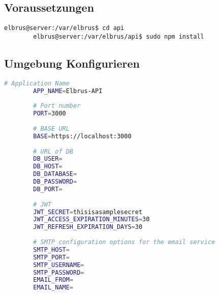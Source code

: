 	\subsection{Voraussetzungen}
	
	\lstset{style=commands}
	\begin{lstlisting}[caption={Nachinstallieren der Abhängigkeiten.}]
		elbrus@server:/var/elbrus$ cd api
		elbrus@server:/var/elbrus/api$ sudo npm install
	\end{lstlisting}

	\subsection[file config]{Umgebung Konfigurieren}
	
	\lstset{style=files}
	\begin{lstlisting}[caption={Anhand von '.env.example' eigene '.env' Datei anlegen.}, language=bash]
		# Application Name
		APP_NAME=Elbrus-API
		
		# Port number
		PORT=3000
		
		# BASE URL
		BASE=https://localhost:3000
		
		# URL of DB
		DB_USER=
		DB_HOST=
		DB_DATABASE=
		DB_PASSWORD=
		DB_PORT=
		
		# JWT
		JWT_SECRET=thisisasamplesecret
		JWT_ACCESS_EXPIRATION_MINUTES=30
		JWT_REFRESH_EXPIRATION_DAYS=30
		
		# SMTP configuration options for the email service
		SMTP_HOST=
		SMTP_PORT=
		SMTP_USERNAME=
		SMTP_PASSWORD=
		EMAIL_FROM=
		EMAIL_NAME=
	\end{lstlisting}
	\newpage
	
